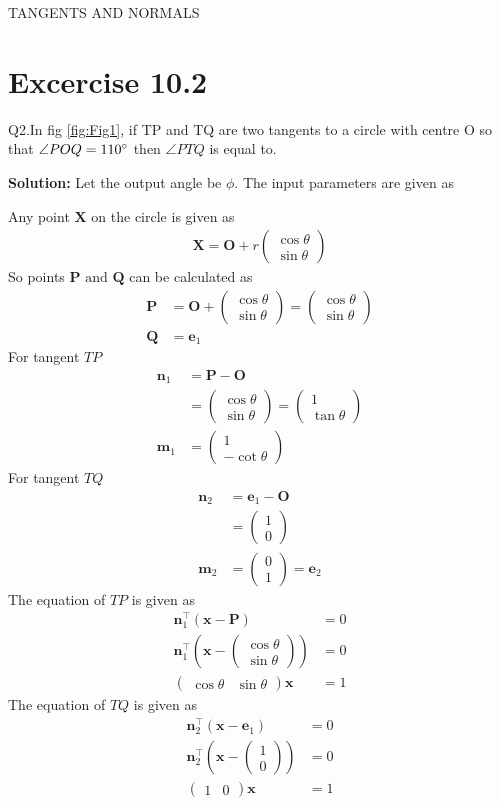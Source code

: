 \documentclass[12pt]{article}
\providecommand{\brak}[1]{\ensuremath{\left(#1\right)}}
\newcommand{\solution}{\noindent \textbf{Solution: }}
\newcommand{\myvec}[1]{\ensuremath{\begin{pmatrix}#1\end{pmatrix}}}
\let\vec\mathbf
\begin{document}
\begin{center}
\textbf\large{TANGENTS AND NORMALS}

\end{center}
\section*{Excercise 10.2}
Q2.In fig \ref{fig:Fig1}, if TP and TQ are two tangents to a circle with centre O so that $\angle{POQ} = 110\degree$ then $\angle{PTQ}$ is equal to.

\solution
Let the output angle be $\phi$.
The input parameters are given as

Any point $\vec{X}$ on the circle is given as
\begin{align}
	\vec{X} = \vec{O}+r\myvec{\cos\theta\\\sin\theta}
\end{align}
So points $\vec{P} \text{ and } \vec{Q}$ can be calculated as
\begin{align}
	\vec{P} &= \vec{O}+\myvec{\cos\theta\\\sin\theta} = \myvec{\cos\theta\\\sin\theta}\\
	\vec{Q} &= \vec{e}_1
\end{align}
For tangent $TP$
\begin{align}
	\vec{n}_1 &= \vec{P}-\vec{O}\\
	&= \myvec{\cos\theta\\\sin\theta} =  \myvec{1\\\tan\theta}\\
	\vec{m}_1 &= \myvec{1\\-\cot\theta}
\end{align}
For tangent $TQ$
\begin{align}
	\vec{n}_2 &= \vec{e}_1-\vec{O}\\
	&= \myvec{1\\0}\\
	\vec{m}_2 &= \myvec{0\\1}=\vec{e}_2
\end{align}
The equation of $TP$ is given as
\begin{align}
	\vec{n}_1^\top\brak{\vec{x}-\vec{P}} &= 0\\
	\vec{n}_1^\top\brak{\vec{x}-\myvec{\cos\theta\\\sin\theta}} &= 0\\
	\label{eq:eq1}
	\myvec{\cos\theta & \sin\theta}\vec{x} &= 1
\end{align}
The equation of $TQ$ is given as
\begin{align}
	\vec{n}_2^\top\brak{\vec{x}-\vec{e}_1} &= 0\\
	\vec{n}_2^\top\brak{\vec{x}-\myvec{1\\0}} &= 0\\
	\label{eq:eq2}
	\myvec{1&0}\vec{x} &= 1
\end{align}
\end{document}
